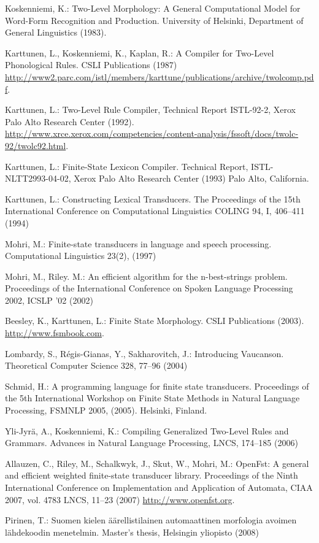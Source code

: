 \documentclass[postprint]{flammie}
\begin{document}
\begin{thebibliography}{}

Koskenniemi, K.:
Two-Level Morphology: A General Computational Model for Word-Form Recognition and Production.
University of Helsinki, Department of General Linguistics (1983).

Karttunen, L., Koskenniemi, K., Kaplan, R.: 
A Compiler for Two-Level Phonological Rules. 
CSLI Publications (1987)
\url{http://www2.parc.com/istl/members/karttune/publications/archive/twolcomp.pdf}.

Karttunen, L.:
Two-Level Rule Compiler, Technical Report ISTL-92-2, Xerox Palo Alto Research Center (1992).
\url{http://www.xrce.xerox.com/competencies/content-analysis/fssoft/docs/twolc-92/twolc92.html}.

Karttunen, L.: 
Finite-State Lexicon Compiler. 
Technical Report, ISTL-NLTT2993-04-02, Xerox Palo Alto Research Center (1993)
Palo Alto, California.

Karttunen, L.:
Constructing Lexical Transducers.
The Proceedings of the 15th International Conference on Computational Linguistics COLING 94, I, 406--411 (1994)

Mohri, M.:
Finite-state transducers in language and speech processing.
Computational Linguistics 23(2), (1997)

Mohri, M., Riley. M.:
An efficient algorithm for the n-best-strings problem.
Proceedings of the International Conference on Spoken Language Processing 2002, ICSLP '02 (2002)

Beesley, K., Karttunen, L.:
Finite State Morphology.
CSLI Publications (2003).
\url{http://www.fsmbook.com}.

Lombardy, S., R\'egis-Gianas, Y., Sakharovitch, J.:
Introducing Vaucanson. 
Theoretical Computer Science 328, 77--96 (2004)

Schmid, H.:
A programming language for finite state transducers.
Proceedings of the 5th International Workshop on Finite State Methods in Natural Language Processing, FSMNLP 2005, (2005).
Helsinki, Finland.

Yli-Jyr\"a, A., Koskenniemi, K.:
Compiling Generalized Two-Level Rules and Grammars.
Advances in Natural Language Processing, LNCS, 174--185 (2006)

Allauzen, C., Riley, M., Schalkwyk, J., Skut, W., Mohri, M.:
Open{F}st: A general and efficient weighted finite-state transducer library.
Proceedings of the Ninth International Conference on Implementation and Application of Automata, CIAA 2007, vol. 4783 LNCS, 11--23 (2007)
\url{http://www.openfst.org}.

Pirinen, T.:
Suomen kielen \"{a}\"{a}rellistilainen automaattinen morfologia avoimen l\"{a}hdekoodin menetelmin.
Master's thesis, Helsingin yliopisto (2008)

\end{thebibliography}
\clearpage
\end{document}

